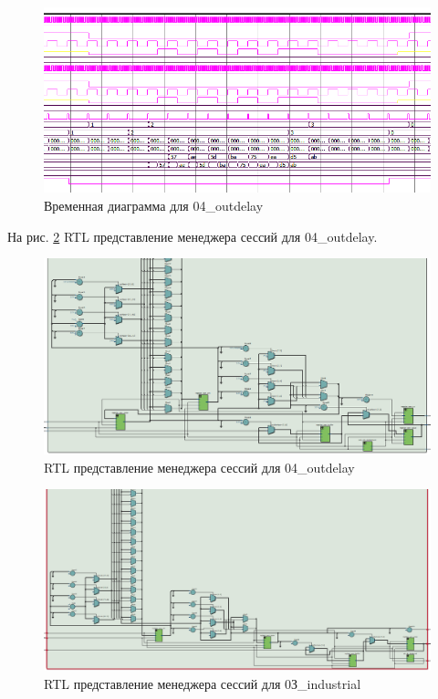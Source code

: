 \documentclass[a4paper,14pt]{article}
\begin{document}
	\begin{figure}[H]
		\centering
		\includegraphics[width=0.9\linewidth]{images/z5_msim_wvf}
		\caption{Временная диаграмма для 04\_outdelay}
		\label{fig:z5msimwvf}
	\end{figure}
	
	На рис. \ref{fig:z5rtl} RTL представление менеджера сессий для 04\_outdelay.
	
	\begin{figure}[H]
		\centering
		\includegraphics[width=0.9\linewidth]{images/z5_rtl}
		\caption{RTL представление менеджера сессий для 04\_outdelay}
		\label{fig:z5rtl}
	\end{figure}

	\begin{figure}[H]
		\centering
		\includegraphics[width=0.9\linewidth]{images/9_5}
		\caption{RTL представление менеджера сессий для 0З\_industrial}
		\label{fig:95}
	\end{figure}
	
\end{document}
